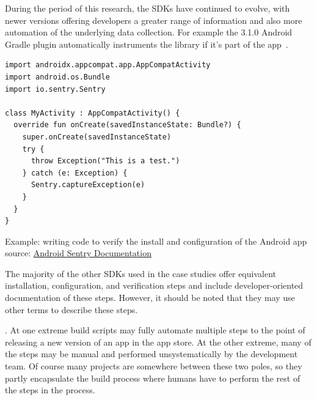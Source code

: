 During the period of this research, the SDKs have continued to evolve, with newer versions offering developers a greater range of information and also more automation of the underlying data collection.  For example the  3.1.0 Android Gradle plugin automatically instruments the  library if it's part of the app~.


\begin{listing}
\begin{verbatim}
import androidx.appcompat.app.AppCompatActivity
import android.os.Bundle
import io.sentry.Sentry

class MyActivity : AppCompatActivity() {
  override fun onCreate(savedInstanceState: Bundle?) {
    super.onCreate(savedInstanceState)
    try {
      throw Exception("This is a test.")
    } catch (e: Exception) {
      Sentry.captureException(e)
    }
  }
}
\end{verbatim}
\caption{Example: writing code to verify the install and configuration of the Android app\\ source: \href{https://docs.sentry.io/platforms/android/}{Android Sentry Documentation}}
\label{listing:android_activity_to_verify_sentry_works_in_app}
\end{listing}

The majority of the other SDKs used in the case studies offer equivalent installation, configuration, and verification steps and include developer-oriented documentation of these steps. However, it should be noted that they may use other terms to describe these steps.

.  
At one extreme build scripts may fully automate multiple steps to the point of releasing a new version of an app in the app store. At the other extreme, many of the steps may be manual and performed unsystematically by the development team. Of course many projects are somewhere between these two poles, so they partly encapsulate the build process where humans have to perform the rest of the steps in the process. 


